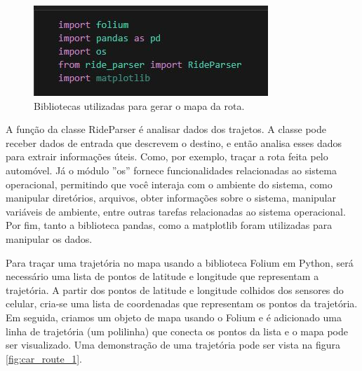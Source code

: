 \begin{figure}[hp]
    \centering
    
    \includegraphics[scale=0.8]{figures/bibliotecas.jpg}
    
    \caption{Bibliotecas utilizadas para gerar o mapa da rota.}
    
    \label{fig:python_libs}
\end{figure}


A função da classe RideParser é analisar dados dos trajetos. A classe pode receber dados de entrada que descrevem o destino, e então analisa esses dados para extrair informações úteis. Como, por exemplo, traçar a rota feita pelo automóvel. Já o módulo 
''os'' fornece funcionalidades relacionadas ao sistema operacional, permitindo que você interaja com o ambiente do sistema, como manipular diretórios, arquivos, obter informações sobre o sistema, manipular variáveis de ambiente, entre outras tarefas relacionadas ao sistema operacional.
Por fim, tanto a biblioteca pandas, como a matplotlib foram utilizadas para manipular os dados.

Para traçar uma trajetória no mapa usando a biblioteca Folium em Python, será necessário uma lista de pontos de latitude e longitude que representam a trajetória. A partir dos pontos de latitude e longitude colhidos dos sensores do celular, cria-se uma lista de coordenadas que representam os pontos da trajetória. Em seguida, criamos um objeto de mapa usando o Folium e é adicionado uma linha de trajetória (um polilinha) que conecta os pontos da lista e o mapa pode ser visualizado. Uma demonstração de uma trajetória pode ser vista na figura \ref{fig:car_route_1}.

